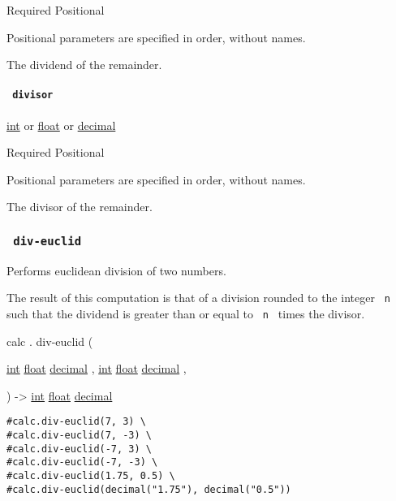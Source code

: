 {Required} {{ Positional }}

\label{functions-rem-dividend-positional-tooltip}
Positional parameters are specified in order, without names.

The dividend of the remainder.

\paragraph{\texorpdfstring{\texttt{\ divisor\ }}{ divisor }}\label{functions-rem-divisor}

\href{/docs/reference/foundations/int/}{int} {or}
\href{/docs/reference/foundations/float/}{float} {or}
\href{/docs/reference/foundations/decimal/}{decimal}

{Required} {{ Positional }}

\label{functions-rem-divisor-positional-tooltip}
Positional parameters are specified in order, without names.

The divisor of the remainder.

\subsubsection{\texorpdfstring{\texttt{\ div-euclid\ }}{ div-euclid }}\label{functions-div-euclid}

Performs euclidean division of two numbers.

The result of this computation is that of a division rounded to the
integer \texttt{\ n\ } such that the dividend is greater than or equal
to \texttt{\ n\ } times the divisor.

calc { . } { div-euclid } (

{ \href{/docs/reference/foundations/int/}{int}
\href{/docs/reference/foundations/float/}{float}
\href{/docs/reference/foundations/decimal/}{decimal} , } {
\href{/docs/reference/foundations/int/}{int}
\href{/docs/reference/foundations/float/}{float}
\href{/docs/reference/foundations/decimal/}{decimal} , }

) -\textgreater{} \href{/docs/reference/foundations/int/}{int}
\href{/docs/reference/foundations/float/}{float}
\href{/docs/reference/foundations/decimal/}{decimal}

\begin{verbatim}
#calc.div-euclid(7, 3) \
#calc.div-euclid(7, -3) \
#calc.div-euclid(-7, 3) \
#calc.div-euclid(-7, -3) \
#calc.div-euclid(1.75, 0.5) \
#calc.div-euclid(decimal("1.75"), decimal("0.5"))
\end{verbatim}

